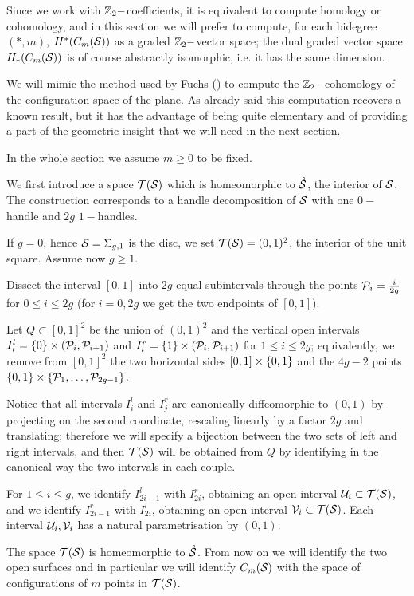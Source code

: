 Since we work with $\Z_2-$coefficients, it is equivalent to compute homology or cohomology,
and in this section we will prefer to compute, for each bidegree $(*,m)$, $H^*(\cms)$ as a graded
$\Z_2-$vector space; the dual graded vector space $H_*(\cms)$ is of course abstractly isomorphic,
i.e. it has the same dimension.

We will mimic the method used by Fuchs (\cite{Fuchs:CohomBraidModtwo}) to compute the $\Z_2-$cohomology
of the configuration space of the plane.
As already said this computation recovers a known result, but it has the advantage of
being quite elementary and of providing a part of
the geometric insight that we will need in the next section.

In the whole section we assume $m\geq 0$ to be fixed.

We first introduce a space $\T(\S)$ which is homeomorphic to $\mrS$, the interior of $\S$. The construction
corresponds to a handle decomposition of $\S$ with one $0-$handle and $2g$ $1-$handles.
\begin{defn}
\label{defn:Tsg}
If $g=0$, hence $\S=\sg$ is the disc, we set $\T(\S)=(0,1)^2$, the interior of the unit square. Assume
now $g\geq 1$.

Dissect the interval $[0,1]$ into $2g$ equal subintervals through the points $\cP_i=\frac{i}{2g}$ for $0\leq i\leq 2g$
(for $i=0,2g$ we get the two endpoints of $[0,1]$).

Let $Q\subset[0,1]^2$ be the union of $(0,1)^2$ and the vertical open intervals
$I_i^l=\set{0}\times (\cP_i,\cP_{i+1})$ and $I_i^r=\set{1}\times (\cP_i,\cP_{i+1})$ for $1\leq i\leq 2g$;
equivalently, we remove from $[0,1]^2$ the two horizontal sides
$[0,1]\times\set{0,1}$ and the $4g-2$ points $\set{0,1}\times \set{\cP_1,\dots,\cP_{2g-1}}$.

Notice that all intervals $I_i^l$ and $I_j^r$ are
canonically diffeomorphic
to $(0,1)$ by projecting on the second coordinate, rescaling linearly by a factor $2g$
and translating; therefore we will specify a bijection
between the two sets of left and right intervals, and then $\T(\S)$ will be obtained from $Q$
by identifying in the canonical way the two intervals in each couple.

For $1\leq i\leq g$, we identify $I^l_{2i-1}$ with $I^r_{2i}$, obtaining an open interval $\U_i\subset\T(\S)$,
and we identify $I^r_{2i-1}$ with $I^l_{2i}$, obtaining an open interval $\V_i\subset\T(\S)$.
Each interval $\U_i,\V_i$ has a natural parametrisation by $(0,1)$.
\end{defn}
The space $\T(\S)$ is homeomorphic to $\mrS$. From now
on we will identify the two open surfaces and in particular we will identify $\cms$ with the
space of configurations of $m$ points in $\T(\S)$.

